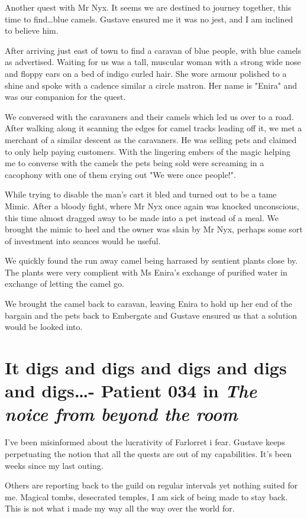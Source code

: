 \documentclass{article}
\begin{document}
Another quest with Mr Nyx. It seems we are destined to journey together, this time to find\dots blue camels. Gustave ensured me it was no jest, and I am inclined to believe him.

After arriving just east of town to find a caravan of blue people, with blue camels as advertised. Waiting for us was a tall, muscular woman with a strong wide nose and floppy ears on a bed of indigo curled hair. She wore armour polished to a shine and spoke with a cadence similar a circle matron. Her name is "Enira" and was our companion for the quest. 

We conversed with the caravaners and their camels which led us over to a road. After walking along it scanning the edges for camel tracks leading off it, we met a merchant of a similar descent as the caravaners. He was selling pets and claimed to only help paying customers. With the lingering embers of the magic helping me to converse with the camels the pets being sold were screaming in a cacophony with one of them crying out "We were once people!".

While trying to disable the man's cart it bled and turned out to be a tame Mimic. After a bloody fight, where Mr Nyx once again was knocked unconscious, this time almost dragged away to be made into a pet instead of a meal. We brought the mimic to heel and the owner was slain by Mr Nyx, perhaps some sort of investment into seances would be useful.

We quickly found the run away camel being harrased by sentient plants close by. The plants were very complient with Ms Enira's exchange of purified water in exchange of letting the camel go.

We brought the camel back to caravan, leaving Enira to hold up her end of the bargain and the pets back to Embergate and Gustave ensured us that a solution would be looked into. 


\section*{It digs and digs and digs and digs and digs\dots - Patient 034 in \textit{The noice from beyond the room}}

I've been misinformed about the lucrativity of Farlorret i fear. Gustave keeps perpetuating the notion that all the quests are out of my capabilities. It's been weeks since my last outing. 

Others are reporting back to the guild on regular intervals yet nothing suited for me. Magical tombs, desecrated temples, I am sick of being made to stay back. This is not what i made my way all the way over the world for.
\end{document}
